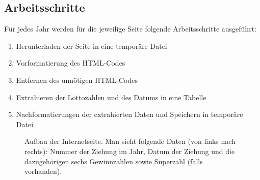 \documentclass[11pt,a4paper]{article}
\begin{document}
\subsection{Arbeitsschritte}
Für jedes Jahr werden für die jeweilige Seite folgende Arbeitsschritte ausgeführt:

\begin{enumerate}
\item Herunterladen der Seite in eine temporäre Datei
\item Vorformatierung des HTML-Codes
\item Entfernen des unnötigen HTML-Codes
\item Extrahieren der Lottozahlen und des Datums in eine Tabelle
\item Nachformatierungen der extrahierten Daten und Speichern in temporäre Datei
\end{enumerate}

\begin{figure}[htbp]
  \centering
  \caption{Aufbau der Internetseite. Man sieht folgende Daten (von links nach rechts): Nummer der Ziehung im Jahr, Datum der Ziehung und die dazugehörigen sechs Gewinnzahlen sowie Superzahl (falls vorhanden).}
  \label{page_header}
\end{figure}
\end{document}
